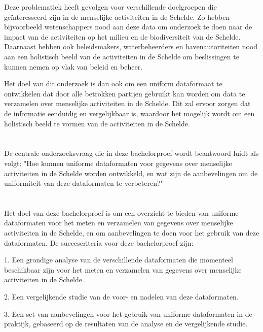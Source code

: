Deze problematiek heeft gevolgen voor verschillende doelgroepen die geïnteresseerd zijn in de menselijke activiteiten in de Schelde. Zo hebben bijvoorbeeld wetenschappers nood aan deze data om onderzoek te doen naar de impact van de activiteiten op het milieu en de biodiversiteit van de Schelde. Daarnaast hebben ook beleidsmakers, waterbeheerders en havenautoriteiten nood aan een holistisch beeld van de activiteiten in de Schelde om beslissingen te kunnen nemen op vlak van beleid en beheer.

Het doel van dit onderzoek is dan ook om een uniform dataformaat te ontwikkelen dat door alle betrokken partijen gebruikt kan worden om data te verzamelen over menselijke activiteiten in de Schelde. Dit zal ervoor zorgen dat de informatie eenduidig en vergelijkbaar is, waardoor het mogelijk wordt om een holistisch beeld te vormen van de activiteiten in de Schelde.

\section{}%
\label{sec:onderzoeksvraag}

De centrale onderzoeksvraag die in deze bachelorproef wordt beantwoord luidt als volgt: "Hoe kunnen uniforme dataformaten voor gegevens over menselijke activiteiten in de Schelde worden ontwikkeld, en wat zijn de aanbevelingen om de uniformiteit van deze dataformaten te verbeteren?"

\section{}%
\label{sec:onderzoeksdoelstelling}

Het doel van deze bachelorproef is om een overzicht te bieden van uniforme dataformaten voor het meten en verzamelen van gegevens over menselijke activiteiten in de Schelde, en om aanbevelingen te doen voor het gebruik van deze dataformaten. De succescriteria voor deze bachelorproef zijn:

1. Een grondige analyse van de verschillende dataformaten die momenteel beschikbaar zijn voor het meten en verzamelen van gegevens over menselijke activiteiten in de Schelde.

2. Een vergelijkende studie van de voor- en nadelen van deze dataformaten.

3. Een set van aanbevelingen voor het gebruik van uniforme dataformaten in de praktijk, gebaseerd op de resultaten van de analyse en de vergelijkende studie.

